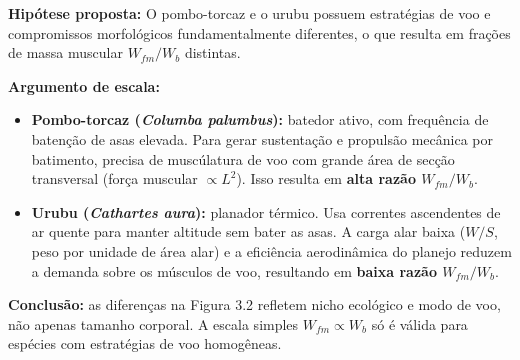 \textbf{Hipótese proposta:}
O pombo-torcaz e o urubu possuem estratégias de voo e compromissos morfológicos fundamentalmente diferentes, o que resulta em frações de massa muscular $W_{fm}/W_b$ distintas.

\textbf{Argumento de escala:}
\begin{itemize}
\item \textbf{Pombo-torcaz (\textit{Columba palumbus}):} batedor ativo, com frequência de batenção de asas elevada. Para gerar sustentação e propulsão mecânica por batimento, precisa de muscúlatura de voo com grande área de secção transversal (força muscular $\propto L^2$). Isso resulta em \textbf{alta razão $W_{fm}/W_b$}.
\item \textbf{Urubu (\textit{Cathartes aura}):} planador térmico. Usa correntes ascendentes de ar quente para manter altitude sem bater as asas. A carga alar baixa ($W/S$, peso por unidade de área alar) e a eficiência aerodinâmica do planejo reduzem a demanda sobre os músculos de voo, resultando em \textbf{baixa razão $W_{fm}/W_b$}.
\end{itemize}

\textbf{Conclusão:} as diferenças na Figura 3.2 refletem nicho ecológico e modo de voo, não apenas tamanho corporal. A escala simples $W_{fm} \propto W_b$ só é válida para espécies com estratégias de voo homogêneas.

